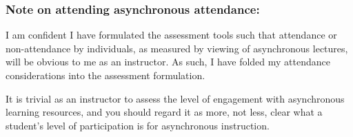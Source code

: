 \documentclass[11pt]{article}
\begin{document}
\subsubsection*{Note on attending asynchronous attendance:}

I am confident I have formulated the assessment tools such that attendance or non-attendance by individuals, as measured by viewing of asynchronous lectures, will be obvious to me as an instructor. As such, I have folded my attendance considerations into the assessment formulation.

\skip

It is trivial as an instructor to assess the level of engagement with asynchronous learning resources, and you should regard it as more, not less, clear what a student's level of participation is for asynchronous instruction.
\end{document}
